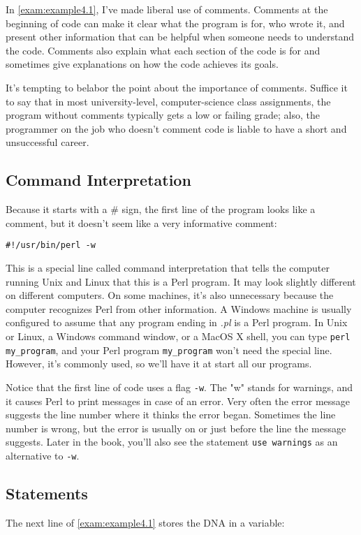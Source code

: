 In \autoref{exam:example4.1}, I've made liberal use of comments. Comments at the beginning of code can make it clear what the program is for, who wrote it, and present other information that can be helpful when someone needs to understand the code. Comments also explain what each section of the code is for and sometimes give explanations on how the code achieves its goals.

It's tempting to belabor the point about the importance of comments.  Suffice it to say that in most university-level, computer-science class assignments, the program without comments typically gets a low or failing grade; also, the programmer on the job who doesn't comment code is liable to have a short and unsuccessful career.

\subsection{Command Interpretation}
Because it starts with a \# sign, the first line of the program looks like a comment, but it doesn't seem like a very informative comment:

\begin{lstlisting}
#!/usr/bin/perl -w
\end{lstlisting}

This is a special line called command interpretation that tells the computer running Unix and Linux that this is a Perl program. It may look slightly different on different computers. On some machines, it's also unnecessary because the computer recognizes Perl from other information.  A Windows machine is usually configured to assume that any program ending in \textit{.pl} is a Perl program. In Unix or Linux, a Windows command window, or a MacOS X shell, you can type \verb|perl my_program|, and your Perl program \verb|my_program| won't need the special line. However, it's commonly used, so we'll have it at start all our programs.

Notice that the first line of code uses a flag \verb|-w|. The "w" stands for warnings, and it causes Perl to print messages in case of an error. Very often the error message suggests the line number where it thinks the error began. Sometimes the line number is wrong, but the error is usually on or just before the line the message suggests. Later in the book, you'll also see the statement \verb|use warnings| as an alternative to \verb|-w|. 

\subsection{Statements}
The next line of \autoref{exam:example4.1} stores the DNA in a variable:

